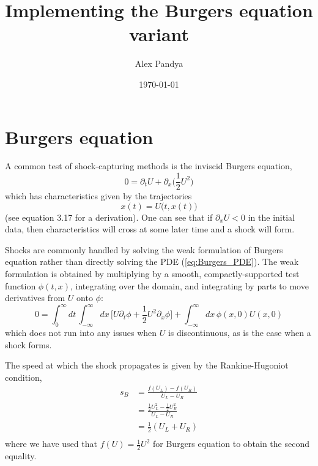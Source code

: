 \documentclass[12pt]{article}
\numberwithin{equation}{section}
\begin{document}
\title{Implementing the Burgers equation variant}
\author{Alex Pandya}
\date{\today}
\maketitle

\section{Burgers equation}

A common test of shock-capturing methods is the inviscid Burgers equation,
\begin{equation} \label{eq:Burgers_PDE}
0 = \partial_t U + \partial_x \Big( \frac{1}{2} U^2 \Big)
\end{equation}
which has characteristics given by the trajectories
\begin{equation}
x(t) = U \big( t, x(t) \big)
\end{equation}
(see \cite{LeVeque92} equation 3.17 for a derivation).
One can see that if $\partial_x U < 0$ in the initial data, then
characteristics will cross at some later time and a shock will form.

Shocks are commonly handled by solving the weak formulation of Burgers
equation rather than directly solving the PDE (\ref{eq:Burgers_PDE}).
The weak formulation is obtained by multiplying by a smooth,
compactly-supported test function $\phi(t,x)$, integrating over the
domain, and integrating by parts to move derivatives from $U$ onto $\phi$:
\begin{equation} \label{eq:Burgers_weak}
0 = \int_{0}^{\infty} dt \, \int_{-\infty}^{\infty} dx \,
    \big[ U \partial_t \phi + \frac{1}{2} U^2 \partial_x \phi \big]
    + \int_{-\infty}^{\infty} dx \, \phi(x, 0) U(x, 0)
\end{equation}
which does not run into any issues when $U$ is discontinuous, as is the
case when a shock forms.

The speed at which the shock propagates is given by the Rankine-Hugoniot
condition,
\begin{equation} \label{eq:Burgers_speed}
\begin{aligned}
s_{B} &= \frac{f(U_L) - f(U_R)}{U_L - U_R} \\
&= \frac{\frac{1}{2} U_L^2 - \frac{1}{2} U_R^2}{U_L - U_R} \\
&= \frac{1}{2} (U_L + U_R) \\
\end{aligned}
\end{equation}
where we have used that $f(U) = \frac{1}{2} U^2$ for Burgers equation to obtain
the second equality.
\end{document}
